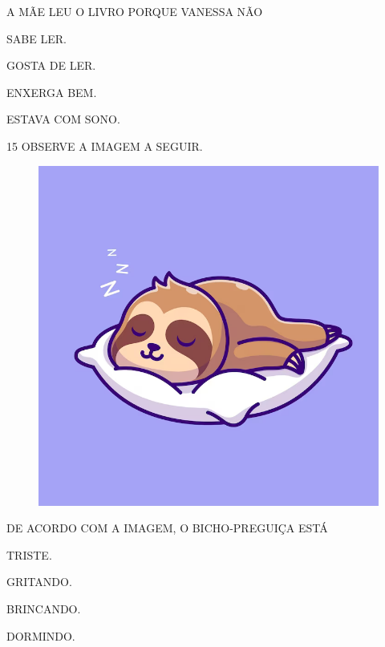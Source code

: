 A MÃE LEU O LIVRO PORQUE VANESSA NÃO

\begin{escolha}

\item SABE LER.

\item GOSTA DE LER.

\item ENXERGA BEM.

\item ESTAVA COM SONO.

\end{escolha}

\num{15} OBSERVE A IMAGEM A SEGUIR.

\begin{figure}[H]
\centering
\includegraphics[width=.8\textwidth]{./media/image245.png}
\end{figure}

DE ACORDO COM A IMAGEM, O BICHO-PREGUIÇA ESTÁ

\begin{escolha}

\item TRISTE.

\item GRITANDO.

\item BRINCANDO.

\item DORMINDO.

\end{escolha}